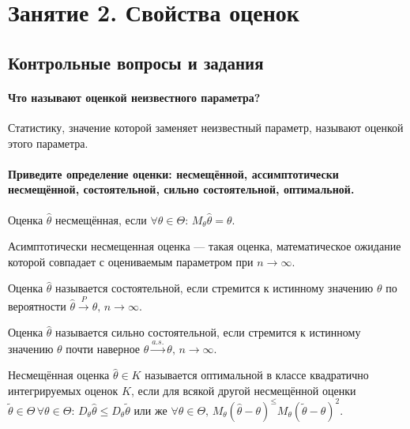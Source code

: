 \chapter*{Занятие 2. Свойства оценок}

\section*{Контрольные вопросы и задания}

\subsubsection*{Что называют оценкой неизвестного параметра?}

Статистику, значение которой заменяет неизвестный параметр, называют оценкой этого параметра.

\subsubsection*{Приведите определение оценки: несмещённой, ассимптотически несмещённой,
                состоятельной, сильно состоятельной, оптимальной.}

Оценка $ \hat{ \theta}$  несмещённая,
если $ \forall \theta \in \Theta: \, M_{ \theta } \hat{ \theta } = \theta $.

Асимптотически несмещенная оценка --- такая оценка,
математическое ожидание которой совпадает с оцениваемым параметром при $n \to \infty $.

Оценка $ \hat{ \theta }$ называется состоятельной,
если стремится к истинному значению $ \theta $ по вероятности
$ \hat{ \theta } \overset{P}{ \rightarrow } \theta, \,
  n \to \infty $.

Оценка $ \hat{ \theta }$ называется сильно состоятельной,
если стремится к истинному значению $ \theta $ почти наверное
$ \hat{ \theta } \overset{a.s.}{ \rightarrow } \theta, \,
  n \to \infty $.

Несмещённая оценка $ \hat{ \theta } \in K$
называется оптимальной в классе квадратично интегрируемых оценок $K$,
если для всякой другой несмещённой оценки
$ \tilde{ \theta } \in \Theta \,
  \forall \theta \in \Theta: \,
  D_{ \theta } \hat{ \theta } \leq D_{ \theta } \tilde{ \theta }$
или же
$ \forall \theta \in \Theta, \,
  M_{ \theta } \left( \hat{ \theta } - \theta \right)^ \leq
  M_{ \theta } \left( \tilde{ \theta } - \theta \right)^2$.

